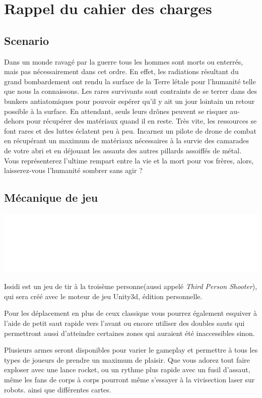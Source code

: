 ﻿\documentclass{article}
\begin{document}
\section{Rappel du cahier des charges}

\subsection{Scenario}
Dans un monde ravagé par la guerre tous les hommes sont morts ou enterrés, mais pas nécessairement dans cet ordre.
En effet, les radiations résultant du grand bombardement ont rendu la surface de la Terre létale pour l'humanité telle que nous 
la connaissons. 
Les rares survivants sont contraints de se terrer dans des bunkers antiatomiques pour pouvoir espérer qu'il y ait un jour lointain un retour possible à la surface. En attendant, seuls leurs drônes peuvent se risquer au-dehors pour récupérer des matériaux quand il en reste.
Très vite, les ressources se font rares et des luttes éclatent peu à peu.
Incarnez un pilote de drone de combat en récupérant un maximum de matériaux nécessaires à la survie des camarades de votre abri et en déjouant les assauts des autres
pillards assoiffés de métal. 
Vous représenterez l'ultime rempart entre la vie et la mort pour vos frères, alors, laisserez-vous l'humanité sombrer sans agir ?

\newpage\subsection{Mécanique de jeu}
\centerline{\includegraphics[scale=0.2]{latex_sa_pue.png}}

 Issidi est un jeu de tir à la troisème personne(aussi appelé \emph{Third Person Shooter}),
qui sera créé avec le moteur de jeu Unity3d, édition personnelle.

Pour les déplacement en plus de ceux classique vous pourrez également esquiver à l'aide de petit saut rapide vers 
l'avant ou encore utiliser des doubles sauts qui permettront aussi d'atteindre certaines zones qui auraient
 été inaccessibles sinon.

Plusieurs armes seront disponibles pour varier le gameplay et permettre à tous les types de joueurs de prendre
 un maximum de plaisir. Que vous adorez tout faire exploser avec une lance rocket, ou un rythme plus rapide avec 
un fusil d'assaut, même les fans de corps à corps pourront même s'essayer à la vivisection laser sur robots. 
ainsi que différentes cartes.
\end{document}
